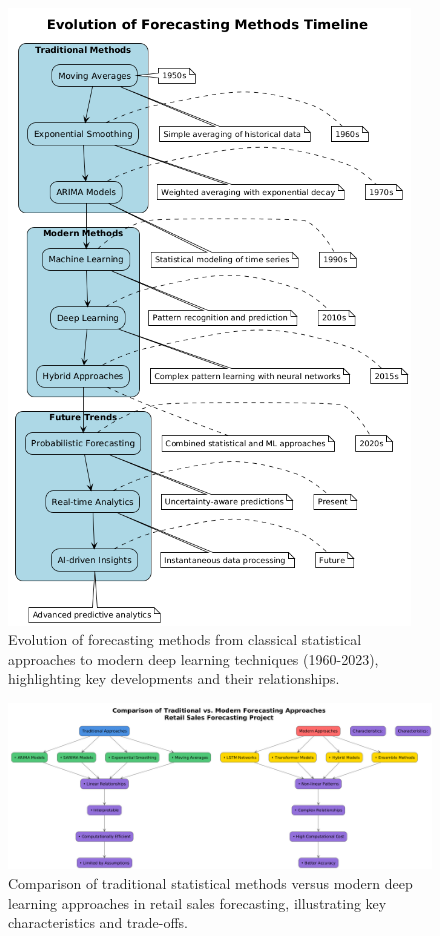 \documentclass[12pt,a4paper]{report}
\begin{document}
\begin{figure}[htbp]
    \centering
    \includegraphics[width=0.95\textwidth]{Evolution of forecasting methods timeline.png}
    \caption{Evolution of forecasting methods from classical statistical approaches to modern deep learning techniques (1960-2023), highlighting key developments and their relationships.}
    \label{fig:forecasting_evolution}
\end{figure}

\begin{figure}[htbp]
    \centering
    \includegraphics[width=\textwidth]{traditional_vs_modern.png}
    \caption{Comparison of traditional statistical methods versus modern deep learning approaches in retail sales forecasting, illustrating key characteristics and trade-offs.}
    \label{fig:traditional_vs_modern}
\end{figure}
\end{document}
